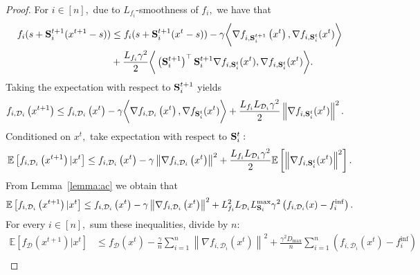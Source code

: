 \documentclass{article}
\newcommand{\bb}{\mathbb}
\newcommand{\cD}{\mathcal{D}}
\newcommand{\Exp}[1]{{\bb E}\left[#1\right]}
\theoremstyle{plain}
\newcommand{\tf}{f_{\mathcal{D}}}
\newcommand{\mS}{{\bf S}}
\theoremstyle{plain}
\theoremstyle{definition}
\theoremstyle{remark}
\begin{document}
\begin{proof}
	For $i\in[n],$ due to $L_{f_i}$-smoothness of $f_i,$ we have that
	\begin{equation*}
		\begin{split}
			f_i(s+\mS^{t+1}_i(x^{t+1} - s)) & \leq f_i(s+\mS^{t+1}_i(x^{t} - s))-\gamma \bigg{<} \nabla f_{i,\mS^{t+1}_i}\left(x^t\right), \nabla f_{i,\mS^{t}_i}(x^t) \bigg{>}\\
			& + \frac{L_{f_i}\gamma^2}{2}\bigg{<} \left(\mS^{t+1}_i\right)^{\top}\mS_i^{t+1}\nabla f_{i,\mS^{t}_i}(x^t), \nabla f_{i,\mS^{t}_i}(x^t) \bigg{>}.\\
		\end{split}
	\end{equation*}
	Taking the expectation with respect to $\mS_i^{t+1}$ yields
	\begin{equation*}
		\begin{split}
			f_{i, \cD_i}\left(x^{t+1}\right) &\leq f_{i, \cD_i}\left(x^{t}\right) - \gamma\bigg{<} \nabla f_{i, \cD_i}\left(x^t\right), \nabla f_{\mS_i^{t}}(x^t) \bigg{>} + \frac{L_{f_i}L_{\cD_i}\gamma^2}{2}\left\|\nabla f_{i,\mS_i^{t}}(x^t)\right\|^2.
		\end{split}
	\end{equation*}
	Conditioned on $x^t,$ take expectation with respect to $\mS^{t}_i:$
	\begin{equation*}
		\begin{split}
			\Exp{f_{i, \cD_i}\left(x^{t+1}\right)|x^t} \leq f_{i, \cD_i}\left(x^{t}\right) - \gamma \left\|\nabla f_{i, \cD_i}\left(x^t\right)\right\|^2 + \frac{L_{f_i}L_{\cD_i}\gamma^2}{2}\Exp{\left\|\nabla f_{i,\mS^{t}_i}(x^t) \right\|^2}.\\
		\end{split}
	\end{equation*}
	From Lemma~\ref{lemma:ac} we obtain that
	\begin{equation*}
		\begin{split}
			\Exp{f_{i, \cD_i}\left(x^{t+1}\right)|x^t} & \leq f_{i, \cD_i}\left(x^{t}\right) - \gamma \left\|\nabla f_{i, \cD_i}\left(x^t\right)\right\|^2 + L_{f_i}^2L_{\cD_i}L^{\max}_{\mS_i}\gamma^2 \left(f_{i, \cD_i}(x) - f_i^{\inf}\right).\\
		\end{split}
	\end{equation*}
	For every $i\in[n],$ sum these inequalities, divide by $n:$
	\begin{equation*}
		\begin{split}
			\Exp{\tf\left(x^{t+1}\right)|x^t} & \leq \tf\left(x^t\right) - \frac{\gamma}{n}\sum_{i=1}^{n}\left\|\nabla f_{i, \cD_i}\left(x^t\right)\right\|^2 + \frac{\gamma^2D_{\max}}{n}\sum_{i=1}^{n}\left(f_{i, \cD_i}(x^t) - f_i^{\inf}\right)\\

\end{split}
\end{equation*}
\end{proof}
\end{document}
